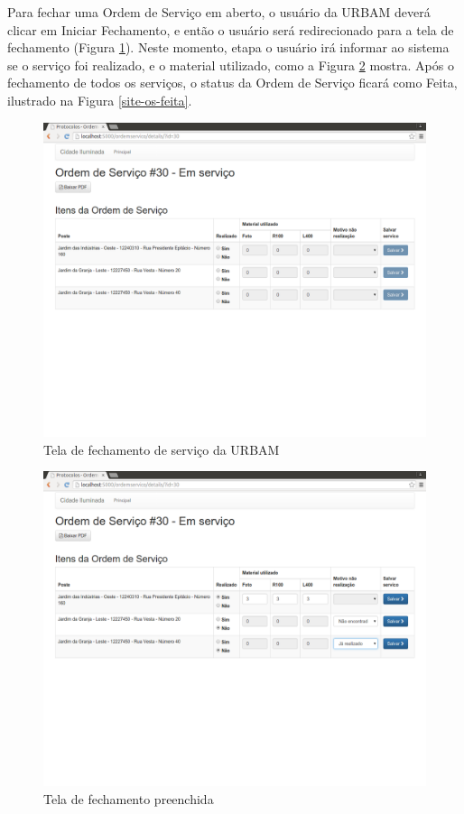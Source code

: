 \documentclass[
	article,			%
	11pt,				%
	oneside,			%
	a4paper,			%
	english,			%
	brazil,				%
	sumario=tradicional
	]{abntex2}
\begin{document}
\clearpage

Para fechar uma Ordem de Serviço em aberto, o usuário da URBAM deverá clicar em Iniciar Fechamento, e então o usuário será redirecionado para a tela de fechamento (Figura \ref{site-fechamento-urbam}).
Neste momento, etapa o usuário irá informar ao sistema se o serviço foi realizado, e o material utilizado, como a Figura \ref{site-material-e-motivo} mostra.
Após o fechamento de todos os serviços, o status da Ordem de Serviço ficará como Feita, ilustrado na Figura \ref{site-os-feita}.

\begin{figure}[!htbp]
 \centering
 \caption{\label{site-fechamento-urbam}Tela de fechamento de serviço da URBAM}
 \includegraphics[scale=0.25]{site/15-fechamento_urbam.png}
\end{figure}

\begin{figure}[!htbp]
 \centering
 \caption{\label{site-material-e-motivo}Tela de fechamento preenchida}
 \includegraphics[scale=0.25]{site/16-material_e_motivo.png}
\end{figure}
\end{document}
